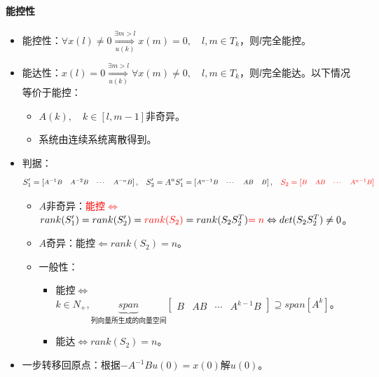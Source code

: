 \documentclass[
12pt, %
a4paper, 
oneside, %
]{scrartcl}
\begin{document}
\paragraph{能控性}
\begin{itemize}
\item 能控性：$ \forall x(l) \neq 0 \underset{u(k)}{\overset{\exists m > l}{\Longrightarrow}} x(m) = 0, \quad l, m \in T_k $，则$ l $完全能控。
\item 能达性：$ x(l) = 0 \underset{u(k)}{\overset{\exists m > l}{\Longrightarrow}} \forall x(m) \neq 0, \quad l, m \in T_k $，则$ l $完全能达。以下情况等价于能控：
\begin{itemize}
\item $ A(k), \quad k \in [l, m - 1] $非奇异。
\item 系统由连续系统离散得到。
\end{itemize}
\item 判据：
$$ \footnotesize S_1' = \begin{bmatrix} A^{-1} B & A^{-2} B & \cdots & A^{-n} B \end{bmatrix}, \quad S_2' = A^n S_1' = \begin{bmatrix} A^{n - 1} B & \cdots & AB & B \end{bmatrix}, \quad \textcolor{red}{S_2 = \begin{bmatrix} B & AB & \cdots & A^{n - 1} B \end{bmatrix}} $$
\begin{itemize}
\item $ A $非奇异：\textcolor{red}{能控$ \Leftrightarrow $}$ rank(S_1') = rank(S_2') = \textcolor{red}{rank(S_2)} = rank(S_2 S_2^T) \textcolor{red}{= n} \Leftrightarrow det(S_2 S_2^T) \neq 0 $。
\item $ A $奇异：能控$ \Leftarrow $$ rank(S_2) = n $。
\item 一般性：
\begin{itemize}
\item 能控$ \Leftrightarrow $$ k \in N_+, \underbrace{span}_{\text{列向量所生成的向量空间}} \begin{bmatrix} B & AB & \cdots & A^{k - 1} B \end{bmatrix} \supseteq span[A^k] $。
\item 能达$ \Leftrightarrow $$ rank(S_2) = n $。
\end{itemize}
\end{itemize}
\item 一步转移回原点：根据$ -A^{-1} B u(0) = x(0) $解$ u(0) $。
\end{itemize}
\end{document}
